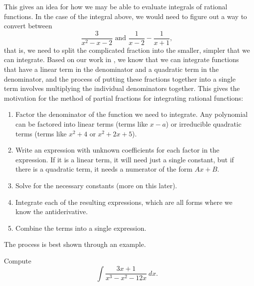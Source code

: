 This gives an idea for how we may be able to evaluate integrals of rational functions. In the case of the integral above, we would need to figure out a way to convert between
\begin{equation*}
\frac{3}{x^2 - x - 2} \text{ and } \frac{1}{x-2} - \frac{1}{x+1},
\end{equation*} 
that is, we need to split the complicated fraction into the smaller, simpler  that we can integrate. Based on our work in , we know that we can integrate functions that have a linear term in the denominator and a quadratic term in the denominator, and the process of putting these fractions together into a single term involves multiplying the individual denominators together. This gives the motivation for the method of partial fractions for integrating rational functions:
\begin{enumerate}
\item Factor the denominator of the function we need to integrate. Any polynomial can be factored into linear terms (terms like $x-a$) or irreducible quadratic terms (terms like $x^2 + 4$ or $x^2 + 2x + 5$).
\item Write an expression with unknown coefficients for each factor in the expression. If it is a linear term, it will need just a single constant, but if there is a quadratic term, it needs a numerator of the form $Ax + B$. 
\item Solve for the necessary constants (more on this later).
\item Integrate each of the resulting expressions, which are all forms where we know the antiderivative.
\item Combine the terms into a single expression.
\end{enumerate}

The process is best shown through an example.

\begin{example}
Compute
\begin{equation*}
\int \frac{3x + 1}{x^3 - x^2 - 12x}\ dx.
\end{equation*}
\end{example}

